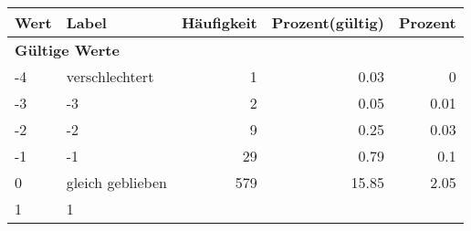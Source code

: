      \begin{longtable}{lXrrr}
     \toprule
     \textbf{Wert} & \textbf{Label} & \textbf{Häufigkeit} & \textbf{Prozent(gültig)} & \textbf{Prozent} \\
     \endhead
     \midrule
     \multicolumn{5}{l}{\textbf{Gültige Werte}}\\

     -4 &
     \multicolumn{1}{X}{ verschlechtert   } &


       \num{1} &
       \num[round-mode=places,round-precision=2]{0.03} &
         \num[round-mode=places,round-precision=2]{0} \\

     -3 &
     \multicolumn{1}{X}{ -3   } &


       \num{2} &
       \num[round-mode=places,round-precision=2]{0.05} &
         \num[round-mode=places,round-precision=2]{0.01} \\

     -2 &
     \multicolumn{1}{X}{ -2   } &


       \num{9} &
       \num[round-mode=places,round-precision=2]{0.25} &
         \num[round-mode=places,round-precision=2]{0.03} \\

     -1 &
     \multicolumn{1}{X}{ -1   } &


       \num{29} &
       \num[round-mode=places,round-precision=2]{0.79} &
         \num[round-mode=places,round-precision=2]{0.1} \\

     0 &
     \multicolumn{1}{X}{ gleich geblieben   } &


       \num{579} &
       \num[round-mode=places,round-precision=2]{15.85} &
         \num[round-mode=places,round-precision=2]{2.05} \\

     1 &
     \multicolumn{1}{X}{ 1   } &



\end{longtable}
